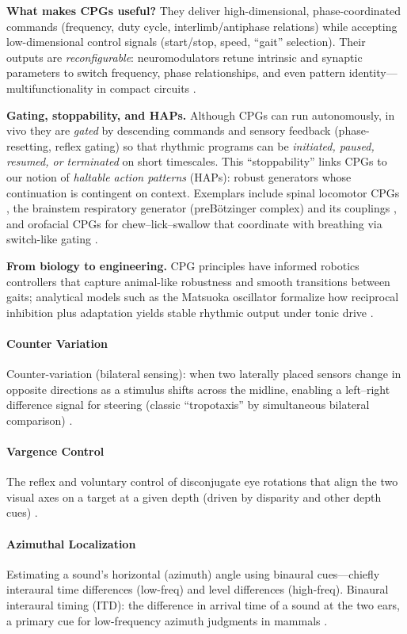 \textbf{What makes CPGs useful?} They deliver high-dimensional, phase-coordinated commands (frequency, duty cycle, interlimb/antiphase relations) while accepting low-dimensional control signals (start/stop, speed, “gait” selection). Their outputs are \emph{reconfigurable}: neuromodulators retune intrinsic and synaptic parameters to switch frequency, phase relationships, and even pattern identity—multifunctionality in compact circuits \citep{NusbaumBeenhakker2002Nature,Marder2012Neuromod}. 

\textbf{Gating, stoppability, and HAPs.} Although CPGs can run autonomously, in vivo they are \emph{gated} by descending commands and sensory feedback (phase-resetting, reflex gating) so that rhythmic programs can be \emph{initiated, paused, resumed, or terminated} on short timescales. This “stoppability” links CPGs to our notion of \emph{haltable action patterns} (HAPs): robust generators whose continuation is contingent on context. Exemplars include spinal locomotor CPGs \citep{Kiehn2016NRN}, the brainstem respiratory generator (preB\"otzinger complex) and its couplings \citep{DelNegro2018BreathingMatters}, and orofacial CPGs for chew–lick–swallow that coordinate with breathing via switch-like gating \citep{Moore2014OrofacialCPG}. 

\textbf{From biology to engineering.} CPG principles have informed robotics controllers that capture animal-like robustness and smooth transitions between gaits; analytical models such as the Matsuoka oscillator formalize how reciprocal inhibition plus adaptation yields stable rhythmic output under tonic drive \citep{Ijspeert2008NN,Matsuoka1985BiolCybern}.

\paragraph{Counter Variation}\label{counter-variation}
Counter-variation (bilateral sensing): when two laterally placed sensors change in opposite directions as a stimulus shifts across the midline, enabling a left–right difference signal for steering (classic “tropotaxis” by simultaneous bilateral comparison) \cite{Britannica_Tropotaxis}. 

\paragraph{Vargence Control}\label{vargence}
The reflex and voluntary control of disconjugate eye rotations that align the two visual axes on a target at a given depth (driven by disparity and other depth cues) \citep{Wismeijer2007VergenceDepthCues,HowardRogers2012PerceivingInDepth_Vol1}. 

\paragraph{Azimuthal Localization}\label{azimuth}
Estimating a sound’s horizontal (azimuth) angle using binaural cues—chiefly interaural time differences (low-freq) and level differences (high-freq).  Binaural interaural timing (ITD): the difference in arrival time of a sound at the two ears, a primary cue for low-frequency azimuth judgments in mammals  \citep{Grothe2010SoundLocalizationReview,Hancock2004ITD_IC_Model}. 
